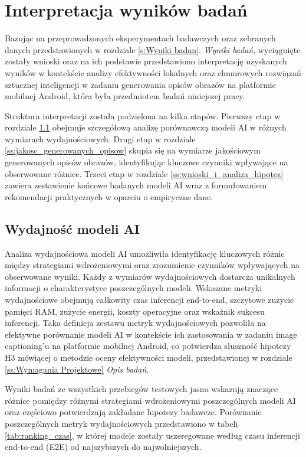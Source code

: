 \newpage %
\section{Interpretacja wyników badań}\label{s:Interpretacja wynikow badan}

\noindent
Bazując na przeprowadzonych eksperymentach badawczych oraz zebranych danych przedstawionych w rozdziale \ref{s:Wyniki badan}.
\textit{Wyniki badań}, wyciągnięte zostały wnioski oraz na ich podstawie przedstawiono interpretację uzyskanych wyników w kontekście analizy efektywności lokalnych oraz chmurowych rozwiązań sztucznej 
inteligencji w zadaniu generowania opisów obrazów na platformie mobilnej Android, która była przedmiotem badań niniejszej pracy.

Struktura interpretacji została podzielona na kilka etapów.
Pierwszy etap w rozdziale \ref{ss:wydajnosc_modeli_ai} obejmuje szczegółową analizę porównawczą modeli AI w różnych wymiarach wydajnościowych.
Drugi etap w rozdziale \ref{ss:jakosc_generowanych_opisow} skupia się na wymiarze jakościowym generowanych opisów obrazów, identyfikując kluczowe czynniki wpływające na obserwowane różnice.
Trzeci etap w rozdziale \ref{ss:wnioski_i_analiza_hipotez} zawiera zestawienie końcowe badanych modeli AI wraz z formułowaniem rekomendacji praktycznych w oparciu o empiryczne dane.

\subsection{Wydajność modeli AI}\label{ss:wydajnosc_modeli_ai}
\noindent   
Analiza wydajnościowa modeli AI umożliwiła identyfikację kluczowych różnic między strategiami wdrożeniowymi oraz zrozumienie czynników wpływających na obserwowane wyniki. 
Każdy z wymiarów wydajnościowych dostarcza unikalnych informacji o charakterystyce poszczególnych modeli. Wskazane metryki wydajnościowe obejmują całkowity czas inferencji end-to-end, szczytowe zużycie pamięci RAM, zużycie energii, koszty operacyjne oraz wskaźnik sukcesu inferencji.
Taka definicja zestawu metryk wydajnościowych pozwoliła na efektywne porównanie modeli AI w kontekście ich zastosowania w zadaniu image captioning'u na platformie mobilnej Android,
co potwierdza słuszność hipotezy H3 mówiącej o metodzie oceny efektywności modeli, przedstawionej w rozdziale \ref{ss:Wymagania Projektowe} \textit{Opis badań}. 

Wyniki badań ze wszystkich przebiegów testowych jasno wskazują znaczące różnice pomiędzy różnymi strategiami wdrożeniowymi poszczególnych modeli AI oraz
częściowo potwierdzają zakładane hipotezy badawcze. Porównanie poszczególnych metryk wydajnościowych przedstawiono w tabeli \ref{tab:ranking_czas}, w której 
modele zostały uszeregowane według czasu inferencji end-to-end (E2E) od najszybszych do najwolniejszych.

